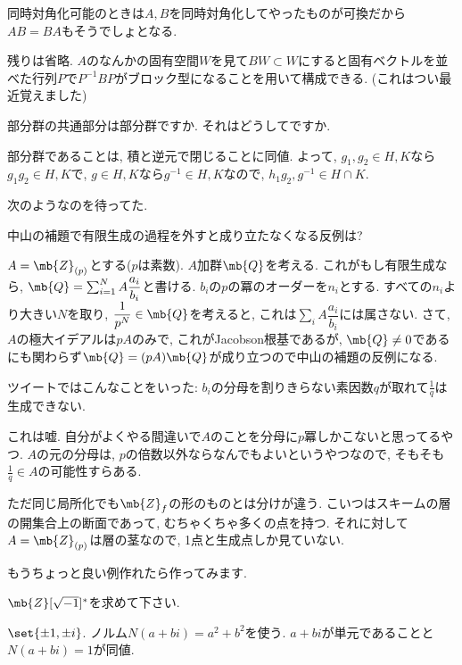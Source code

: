 \begin{ans}
同時対角化可能のときは$A,B$を同時対角化してやったものが可換だから$AB=BA$もそうでしょとなる. \par
残りは省略. $A$のなんかの固有空間$W$を見て$BW\subset W$にすると固有ベクトルを並べた行列$P$で$P^{-1}BP$がブロック型になることを用いて構成できる. (これはつい最近覚えました)
\end{ans}

\begin{prob}
部分群の共通部分は部分群ですか. それはどうしてですか. 
\end{prob}

\begin{ans}
部分群であることは, 積と逆元で閉じることに同値. よって,  $g_1,g_2\in H,K$なら$g_1g_2\in H,K$で, $g\in H,K$なら$g^{-1} \in H,K$なので, $h_1g_2, g^{-1}\in H\cap K$. 
\end{ans}

次のようなのを待ってた. 
\begin{prob}
中山の補題で有限生成の過程を外すと成り立たなくなる反例は? 
\end{prob}
\begin{ans}
$A=\mb{Z}_{(p)}$とする($p$は素数). $A$加群$\mb{Q}$を考える. これがもし有限生成なら, $\mb{Q} = \sum_{i=1}^N A\dfrac{a_{i}}{b_i}$と書ける. $b_i$の$p$の冪のオーダーを$n_i$とする. すべての$n_i$より大きい$N$を取り, $\dfrac{1}{p^N}\in \mb{Q}$を考えると, これは$\sum_{i} A\dfrac{a_{i}}{b_i}$には属さない. さて, $A$の極大イデアルは$pA$のみで, これがJacobson根基であるが, $\mb{Q}\neq 0$であるにも関わらず$\mb{Q} = (pA)\mb{Q}$が成り立つので中山の補題の反例になる.  
\end{ans}

\begin{miss}ツイートではこんなことをいった: 
$b_i$の分母を割りきらない素因数$q$が取れて$\frac{1}{q}$は生成できない. \par 
これは嘘. 自分がよくやる間違いで$A$のことを分母に$p$冪しかこないと思ってるやつ. $A$の元の分母は, $p$の倍数以外ならなんでもよいというやつなので, そもそも$\frac{1}{q}\in A$の可能性すらある. 
\end{miss}
ただ同じ局所化でも$\mb{Z}_{f}$の形のものとは分けが違う. こいつはスキームの層の開集合上の断面であって, むちゃくちゃ多くの点を持つ. それに対して$A=\mb{Z}_{(p)}$は層の茎なので, 1点と生成点しか見ていない. \par 
もうちょっと良い例作れたら作ってみます.

\begin{prob}
$\mb{Z}[\sqrt{-1}]^{\ast}$を求めて下さい. 
\end{prob}
\begin{ans}
$\set{\pm 1,\pm i}$. ノルム$N(a+bi) = a^2 + b^2$を使う. $a+bi$が単元であることと$N(a+bi) = 1$が同値. 
\end{ans}

